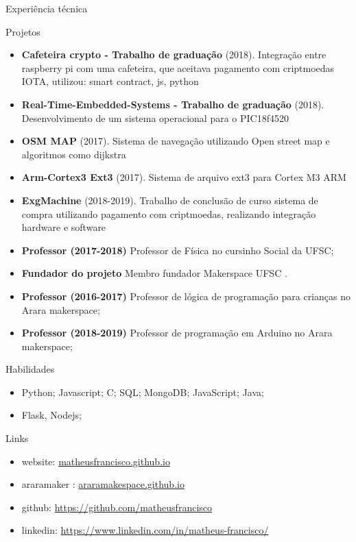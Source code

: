 \documentclass[]{mcdowellcv}
\begin{document}
	\begin{cvsection}{Experiência técnica}
		\begin{cvsubsection}{Projetos}{}{}
			\begin{itemize}
				\item \textbf{Cafeteira crypto - Trabalho de graduação} (2018). Integração entre raspberry pi com uma cafeteira, que aceitava pagamento com criptmoedas IOTA, utilizou: smart contract, js, python
				\item \textbf{Real-Time-Embedded-Systems - Trabalho de graduação} (2018). Desenvolvimento de um sistema operacional para o  PIC18f4520
				\item \textbf{OSM MAP} (2017).  Sistema de navegação utilizando Open street map e  algoritmos como  dijkstra
				\item \textbf{Arm-Cortex3 Ext3} (2017).  Sistema de arquivo ext3 para Cortex M3 ARM
				\item \textbf{ExgMachine} (2018-2019).  Trabalho de conclusão de curso sistema de compra utilizando pagamento com criptmoedas, realizando integração hardware e software
				\item \textbf{Professor (2017-2018)} Professor de Física no cursinho Social da UFSC;
				\item \textbf{Fundador do projeto} Membro fundador Makerspace UFSC .
				\item \textbf{Professor (2016-2017)} Professor de lógica de programação para crianças no Arara makerspace;
				\item \textbf{Professor (2018-2019)} Professor de programação em Arduino no Arara makerspace;
			\end{itemize}
		\end{cvsubsection}
	\end{cvsection}
	
	
	\begin{cvsection}{Habilidades}
		\begin{cvsubsection}{}{}{}	
			\begin{itemize}
				\item Python; Javascript; C; SQL; MongoDB; JavaScript; Java;
				\item Flask, Nodejs; 
			\end{itemize}
		\end{cvsubsection}
	\end{cvsection}

	\begin{cvsection}{Links}
		\begin{cvsubsection}{}{}{}	
			\begin{itemize}
				\item website: \url{matheusfrancisco.github.io}
				\item araramaker :  \url{araramakespace.github.io}
				\item github: \url{https://github.com/matheusfrancisco}
				\item linkedin: \url{https://www.linkedin.com/in/matheus-francisco/} 
			\end{itemize}
		\end{cvsubsection}
	\end{cvsection}
	
\end{document}
